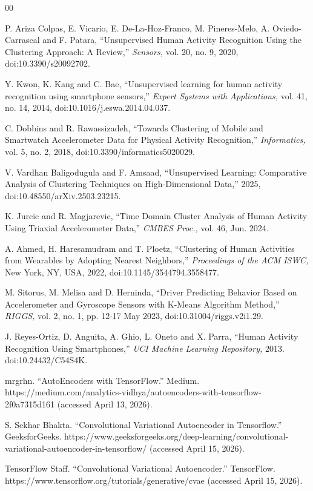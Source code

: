 \documentclass[12pt]{IEEEtran}
\begin{document}
\begin{thebibliography}{00}
\normalsize

 P. Ariza Colpas, E. Vicario, E. De-La-Hoz-Franco, M. Pineres-Melo, A. Oviedo-Carrascal and F. Patara, ``Unsupervised Human Activity Recognition Using the Clustering Approach: A Review,'' \emph{Sensors,} vol. 20, no. 9, 2020, doi:10.3390/s20092702.

 Y. Kwon, K. Kang and C. Bae, ``Unsupervised learning for human activity recognition using smartphone sensors,'' \emph{Expert Systems with Applications,} vol. 41, no. 14, 2014, doi:10.1016/j.eswa.2014.04.037.

 C. Dobbins and R. Rawassizadeh, ``Towards Clustering of Mobile and Smartwatch Accelerometer Data for Physical Activity Recognition,'' \emph{Informatics,} vol. 5, no. 2, 2018, doi:10.3390/informatics5020029.

 V. Vardhan Baligodugula and F. Amsaad, ``Unsupervised Learning: Comparative Analysis of Clustering Techniques on High-Dimensional Data,'' 2025, doi:10.48550/arXiv.2503.23215.

 K. Jurcic and R. Magjarevic, ``Time Domain Cluster Analysis of Human Activity Using Triaxial Accelerometer Data,'' \emph{CMBES Proc.,} vol. 46, Jun. 2024.

 A. Ahmed, H. Haresamudram and T. Ploetz, ``Clustering of Human Activities from Wearables by Adopting Nearest Neighbors,'' \emph{Proceedings of the ACM ISWC,} New York, NY, USA, 2022, doi:10.1145/3544794.3558477.

 M. Sitorus, M. Melisa and D. Herninda, ``Driver Predicting Behavior Based on Accelerometer and Gyroscope Sensors with K-Means Algorithm Method,'' \emph{RIGGS,} vol. 2, no. 1, pp. 12-17 May 2023, doi:10.31004/riggs.v2i1.29.

 J. Reyes-Ortiz, D. Anguita, A. Ghio, L. Oneto and X. Parra, ``Human Activity Recognition Using Smartphones,'' \emph{UCI Machine Learning Repository,} 2013. doi:10.24432/C54S4K.

 mrgrhn. ``AutoEncoders with TensorFlow.'' Medium. https://medium.com/analytics-vidhya/autoencoders-with-tensorflow-2f0a7315d161 (accessed April 13, 2026).

 S. Sekhar Bhakta. ``Convolutional Variational Autoencoder in Tensorflow.'' GeeksforGeeks. https://www.geeksforgeeks.org/deep-learning/convolutional-variational-autoencoder-in-tensorflow/ (accessed April 15, 2026).

 TensorFlow Staff. ``Convolutional Variational Autoencoder.'' TensorFlow. https://www.tensorflow.org/tutorials/generative/cvae (accessed April 15, 2026).

\end{thebibliography}
\end{document}
